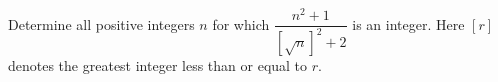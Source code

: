 Determine all positive integers $n$ for which $\dfrac{n^2+1}{[\sqrt{n}]^2+2}$ is an integer. Here $[r]$ denotes the greatest integer less than or equal to $r$.